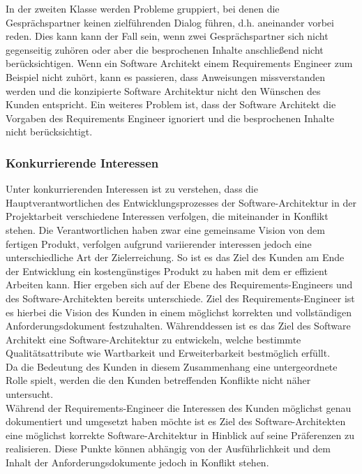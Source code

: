 In der zweiten Klasse werden Probleme gruppiert, bei denen die Gesprächspartner keinen zielführenden Dialog führen, d.h. aneinander vorbei reden. Dies kann kann der Fall sein, wenn zwei Gesprächspartner sich nicht gegenseitig zuhören oder aber die besprochenen Inhalte anschließend nicht berücksichtigen. Wenn ein Software Architekt einem Requirements Engineer zum Beispiel nicht zuhört, kann es passieren, dass Anweisungen missverstanden werden und die konzipierte Software Architektur nicht den Wünschen des Kunden entspricht. Ein weiteres Problem ist, dass der Software Architekt die Vorgaben des Requirements Engineer ignoriert und die besprochenen Inhalte nicht berücksichtigt. \\

\subsubsection{Konkurrierende Interessen}
Unter konkurrierenden Interessen ist zu verstehen, dass die Hauptverantwortlichen des Entwicklungsprozesses der Software-Architektur in der Projektarbeit verschiedene Interessen verfolgen, die miteinander in Konflikt stehen. Die Verantwortlichen haben zwar eine gemeinsame Vision von dem fertigen Produkt, verfolgen aufgrund variierender interessen jedoch eine unterschiedliche Art der Zielerreichung.
So ist es das Ziel des Kunden am Ende der Entwicklung ein kostengünstiges Produkt zu haben mit dem er effizient Arbeiten kann. Hier ergeben sich auf der Ebene des Requirements-Engineers und des Software-Architekten bereits unterschiede. Ziel des Requirements-Engineer ist es hierbei die Vision des Kunden in einem möglichst korrekten und vollständigen Anforderungsdokument festzuhalten. Währenddessen ist es das Ziel des Software Architekt eine Software-Architektur zu entwickeln, welche bestimmte Qualitätsattribute wie Wartbarkeit und Erweiterbarkeit bestmöglich erfüllt. \\
Da die Bedeutung des Kunden in diesem Zusammenhang eine untergeordnete Rolle spielt, werden die den Kunden betreffenden Konflikte nicht näher untersucht. \\
Während der Requirements-Engineer die Interessen des Kunden möglichst genau dokumentiert und umgesetzt haben möchte ist es Ziel des Software-Architekten eine möglichst korrekte Software-Architektur in Hinblick auf seine Präferenzen zu realisieren. Diese Punkte können abhängig von der Ausführlichkeit und dem Inhalt der Anforderungsdokumente jedoch in Konflikt stehen.

